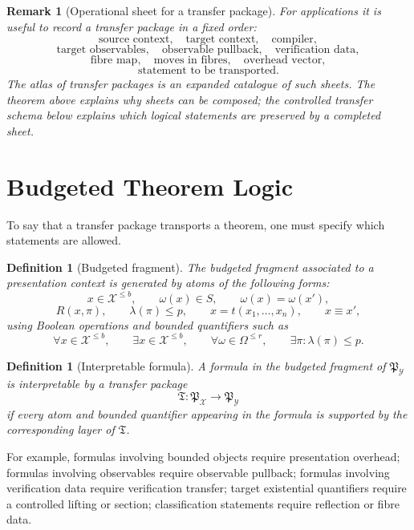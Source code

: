 \documentclass[11pt]{article}
\newtheorem{definition}[theorem]{Definition}
\newtheorem{remark}[theorem]{Remark}
\begin{document}
\begin{remark}[Operational sheet for a transfer package]
For applications it is useful to record a transfer package in a fixed order:
\[
\text{source context},\quad
\text{target context},\quad
\text{compiler},
\]
\[
\text{target observables},\quad
\text{observable pullback},\quad
\text{verification data},
\]
\[
\text{fibre map},\quad
\text{moves in fibres},\quad
\text{overhead vector},
\]
\[
\text{statement to be transported}.
\]
The atlas of transfer packages is an expanded catalogue of such sheets. The theorem above explains why sheets can be composed; the controlled transfer schema below explains which logical statements are preserved by a completed sheet.
\end{remark}

\section{Budgeted Theorem Logic}

To say that a transfer package transports a theorem, one must specify which statements are allowed.

\begin{definition}[Budgeted fragment]
The budgeted fragment associated to a presentation context is generated by atoms of the following forms:
\[
x\in\mathcal X^{\leq b},
\qquad
\omega(x)\in S,
\qquad
\omega(x)=\omega(x'),
\]
\[
R(x,\pi),
\qquad
\lambda(\pi)\leq p,
\qquad
x=t(x_1,\ldots,x_n),
\qquad
x\equiv x',
\]
using Boolean operations and bounded quantifiers such as
\[
\forall x\in\mathcal X^{\leq b},
\qquad
\exists x\in\mathcal X^{\leq b},
\qquad
\forall \omega\in\Omega^{\leq r},
\qquad
\exists \pi:\lambda(\pi)\leq p.
\]
\end{definition}

\begin{definition}[Interpretable formula]
A formula in the budgeted fragment of \(\mathfrak P_\mathcal Y\) is interpretable by a transfer package
\[
\mathfrak T:\mathfrak P_\mathcal X\to\mathfrak P_\mathcal Y
\]
if every atom and bounded quantifier appearing in the formula is supported by the corresponding layer of \(\mathfrak T\).
\end{definition}

For example, formulas involving bounded objects require presentation overhead; formulas involving observables require observable pullback; formulas involving verification data require verification transfer; target existential quantifiers require a controlled lifting or section; classification statements require reflection or fibre data.
\end{document}
